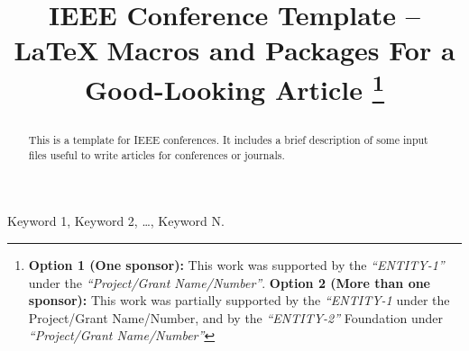 \documentclass[conference]{IEEEtran}
\begin{document}
\title{IEEE Conference Template -- \LaTeX\,\,Macros and Packages For a Good-Looking Article
\thanks{
\textbf{Option 1 (One sponsor):} This work was supported by the \textit{``ENTITY-1''} under the \textit{``Project/Grant Name/Number''}.
\textbf{Option 2 (More than one sponsor):} This work was partially supported by the \textit{``ENTITY-1} under the Project/Grant Name/Number, and by the \textit{``ENTITY-2''} Foundation under \textit{``Project/Grant Name/Number''}
} %

}


\author{
}


\maketitle

\begin{abstract}
This is a template for IEEE conferences.
It includes a brief description of some input files useful to write articles for conferences or journals.
\end{abstract}

\begin{IEEEkeywords}
Keyword 1, Keyword 2, \dots, Keyword N.
\end{IEEEkeywords}
\end{document}
